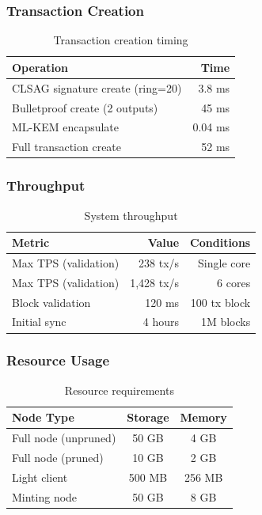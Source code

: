 \subsubsection{Transaction Creation}

\begin{table}[h]
\centering
\caption{Transaction creation timing}
\label{tab:creation-timing}
\begin{tabular}{@{}lr@{}}
\toprule
\textbf{Operation} & \textbf{Time} \\
\midrule
CLSAG signature create (ring=20) & 3.8 ms \\
Bulletproof create (2 outputs) & 45 ms \\
ML-KEM encapsulate & 0.04 ms \\
Full transaction create & 52 ms \\
\bottomrule
\end{tabular}
\end{table}

\subsubsection{Throughput}

\begin{table}[h]
\centering
\caption{System throughput}
\label{tab:throughput}
\begin{tabular}{@{}lrr@{}}
\toprule
\textbf{Metric} & \textbf{Value} & \textbf{Conditions} \\
\midrule
Max TPS (validation) & 238 tx/s & Single core \\
Max TPS (validation) & 1,428 tx/s & 6 cores \\
Block validation & 120 ms & 100 tx block \\
Initial sync & 4 hours & 1M blocks \\
\bottomrule
\end{tabular}
\end{table}

\subsubsection{Resource Usage}

\begin{table}[h]
\centering
\caption{Resource requirements}
\label{tab:resources}
\begin{tabular}{@{}lcc@{}}
\toprule
\textbf{Node Type} & \textbf{Storage} & \textbf{Memory} \\
\midrule
Full node (unpruned) & 50 GB & 4 GB \\
Full node (pruned) & 10 GB & 2 GB \\
Light client & 500 MB & 256 MB \\
Minting node & 50 GB & 8 GB \\
\bottomrule
\end{tabular}
\end{table}

